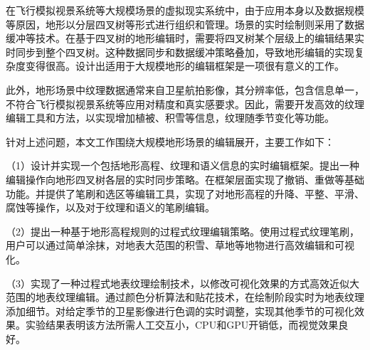 
\begin{cabstract}
	在飞行模拟视景系统等大规模场景的虚拟现实系统中，由于应用本身以及数据规模等原因，地形以分层四叉树等形式进行组织和管理。场景的实时绘制则采用了数据缓冲等技术。在基于四叉树的地形编辑时，需要将四叉树某个层级上的编辑结果实时同步到整个四叉树。这种数据同步和数据缓冲策略叠加，导致地形编辑的实现复杂度变得很高。设计出适用于大规模地形的编辑框架是一项很有意义的工作。\par
	此外，地形场景中纹理数据通常来自卫星航拍影像，其分辨率低，包含信息单一，不符合飞行模拟视景系统等应用对精度和真实感要求。因此，需要开发高效的纹理编辑工具和方法，以实现增加植被、积雪等信息，纹理随季节变化等功能。\par
	针对上述问题，本文工作围绕大规模地形场景的编辑展开，主要工作如下：\par
	（1）设计并实现一个包括地形高程、纹理和语义信息的实时编辑框架。提出一种编辑操作向地形四叉树各层的实时同步策略。在框架层面实现了撤销、重做等基础功能。并提供了笔刷和选区等编辑工具，实现了对地形高程的升降、平整、平滑、腐蚀等操作，以及对于纹理和语义的笔刷编辑。\par
	（2）提出一种基于地形高程规则的过程式纹理编辑策略。使用过程式纹理笔刷，用户可以通过简单涂抹，对地表大范围的积雪、草地等地物进行高效编辑和可视化。\par
	（3）实现了一种过程式地表纹理绘制技术，以修改可视化效果的方式高效近似大范围的地表纹理编辑。通过颜色分析算法和贴花技术，在绘制阶段实时为地表纹理添加细节。对给定季节的卫星影像进行色调的实时调整，实现其他季节的可视化效果。实验结果表明该方法所需人工交互小，CPU和GPU开销低，而视觉效果良好。\par

\end{cabstract}
\cleardoublepage
